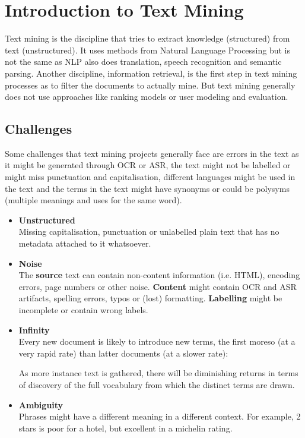 \section{Introduction to Text Mining}

Text mining is the discipline that tries to extract knowledge (structured)
from text (unstructured). It uses methods from Natural Language Processing
but is not the same as NLP also does translation, speech recognition and
semantic parsing. Another discipline, information retrieval, is the first
step in text mining processes as to filter the documents to actually mine.
But text mining generally does not use approaches like ranking models or
user modeling and evaluation.

\subsection{Challenges}

Some challenges that text mining projects generally face are errors in the
text as it might be generated through OCR or ASR, the text might not be labelled
or might miss punctuation and capitalisation, different languages might be used
in the text and the terms in the text might have synonyms or could be polysyms
(multiple meanings and uses for the same word).

\begin{itemize}

  \item \textbf{Unstructured} \\
    Missing capitalisation, punctuation or unlabelled plain
    text that has no metadata attached to it whatsoever.

  \item \textbf{Noise} \\
    The \textbf{source} text can contain non-content information
    (i.e. HTML), encoding errors, page numbers or other noise.
    \textbf{Content} might
    contain OCR and ASR artifacts, spelling errors, typos or (lost) formatting.
    \textbf{Labelling} might be incomplete or contain wrong labels.

  \item \textbf{Infinity} \\
    Every new document is likely to introduce new terms, the first
    moreso (at a very rapid rate) than latter documents (at a slower rate):

    \begin{definition}
      As more instance text is gathered, there will be diminishing
      returns in terms of discovery of the full vocabulary from which
      the distinct terms are drawn.
    \end{definition}

  \item \textbf{Ambiguity} \\
    Phrases might have a different meaning in a different context.
    For example, 2 stars is poor for a hotel, but excellent in a
    michelin rating.

\end{itemize}

